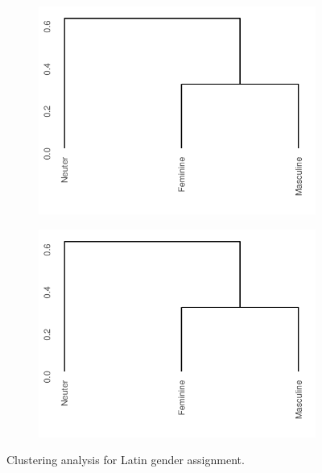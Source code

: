 \begin{figure}[!htpb]

  \begin{subfigure}{.5\textwidth}
    \centering
    \includegraphics[scale=0.6]{./figures/latin/dendro-nouns.pdf}
  \end{subfigure}%
  \begin{subfigure}{.5\textwidth}
    \centering
    \includegraphics[scale=0.6]{./figures/latin/dendro-nouns-small.pdf}
  \end{subfigure}
\caption{Clustering analysis for Latin gender assignment.}\label{fig:clustering-latin}
\end{figure}

